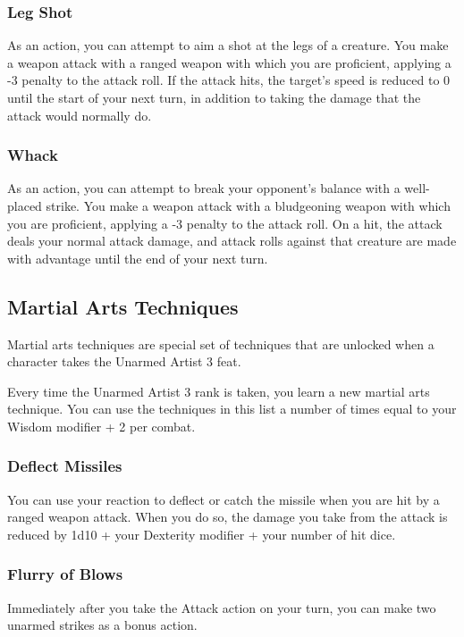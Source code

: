 \subsubsection{Leg Shot} \label{tec::legshot}
As an action, you can attempt to aim a shot at the legs of a creature.
You make a weapon attack with a ranged weapon with which you are proficient, applying a -3 penalty to the attack roll.
If the attack hits, the target's speed is reduced to 0 until the start of your next turn, in addition to taking the damage that the attack would normally do.

\subsubsection{Whack} \label{tec::whack}
As an action, you can attempt to break your opponent's balance with a well-placed strike.
You make a weapon attack with a bludgeoning weapon with which you are proficient, applying a -3 penalty to the attack roll.
On a hit, the attack deals your normal attack damage, and attack rolls against that creature are made with advantage until the end of your next turn.

\subsection*{Martial Arts Techniques} \label{tec::martialartstechniques}
Martial arts techniques are special set of techniques that are unlocked when a character takes the Unarmed Artist 3 feat.

Every time the Unarmed Artist 3 rank is taken, you learn a new martial arts technique.
You can use the techniques in this list a number of times equal to your Wisdom modifier + 2 per combat.

\subsubsection{Deflect Missiles} \label{mtec::deflectmissiles}
You can use your reaction to deflect or catch the missile when you are hit by a ranged weapon attack.
When you do so, the damage you take from the attack is reduced by 1d10 + your Dexterity modifier + your number of hit dice.

\subsubsection{Flurry of Blows} \label{mtec::flurryofblows}
Immediately after you take the Attack action on your turn, you can make two unarmed strikes as a bonus action.

